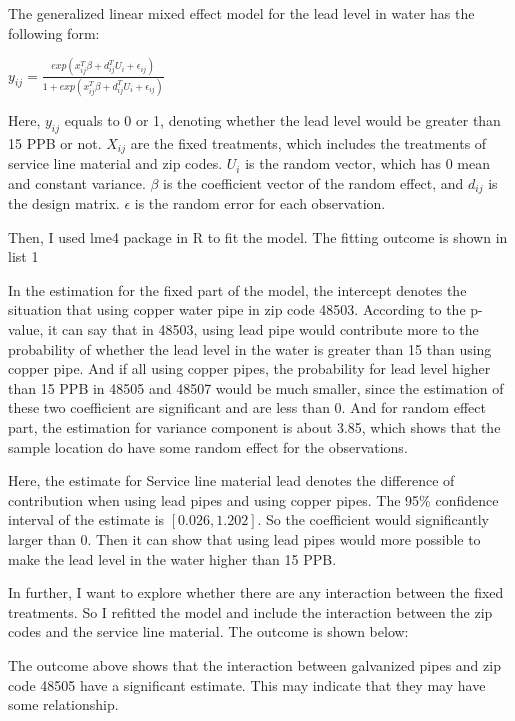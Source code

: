 \documentclass[letterpaper,12pt]{article}
\begin{document}
The generalized linear mixed effect model for the lead level in water has the following form:
\begin{center}
\large{$y_{ij} = \frac{exp(x_{ij}^T \beta + d_{ij}^{T}U_{i} + \epsilon_{ij})}{1 + exp(x_{ij}^T \beta + d_{ij}^{T}U_{i} + \epsilon_{ij})}$}
\end{center}
Here, $y_{ij}$ equals to 0 or 1, denoting whether the lead level would be greater than 15 PPB or not. $X_{ij}$ are the fixed treatments, which includes the treatments of service line material and zip codes. $U_{i}$ is the random vector, which has 0 mean and constant variance. $\beta$ is the coefficient vector of the random effect, and $d_{ij}$  is the design matrix. $\epsilon$ is the random error for each observation.  

Then, I used lme4 package in R to fit the model. The fitting outcome is shown in list 1


In the estimation for the fixed part of the model, the intercept denotes the situation that using copper water pipe in zip code 48503. According to the p-value, it can say that in 48503, using lead pipe would contribute more to the probability of whether the lead level in the water is greater than 15 than using copper pipe. And if all using copper pipes, the probability for lead level higher than 15 PPB in 48505 and 48507 would be much smaller, since the estimation of these two coefficient are significant and are less than 0. And for random effect part, the estimation for variance component is about 3.85, which shows that the sample location do have some random effect for the observations.

Here, the estimate for Service line material lead denotes the difference of contribution when using lead pipes and using copper pipes. The 95\% confidence interval of the estimate is $[0.026, 1.202]$. So the coefficient would significantly larger than 0. Then it can show that using lead pipes would more possible to make the lead level in the water higher than 15 PPB. 

In further, I want to explore whether there are any interaction between the fixed treatments. So I refitted the model and include the interaction between the zip codes and the service line material. The outcome is shown below:


\noindent The outcome above shows that the interaction between galvanized pipes and zip code 48505 have a significant estimate. This may indicate that they may have some relationship.
\end{document}

